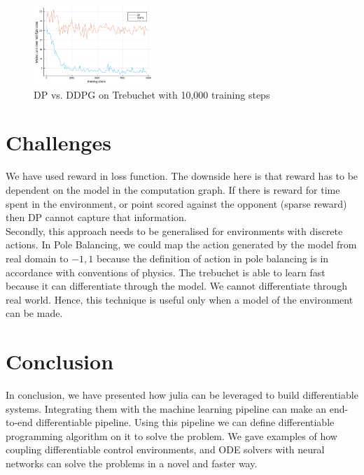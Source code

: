 \documentclass{juliacon}
\begin{document}
\begin{figure}[htbp]
    \centering
        \includegraphics[width=0.4\textwidth,keepaspectratio]{images/trebuchet_DPvsDDPG_10000.png}
            \caption{DP vs. DDPG\cite{Lillicrap2015ContinuousCW} on Trebuchet with 10,000 training steps}
            \label{fig:trebuchet_graph}
\end{figure}

\section{Challenges}
We have used reward in loss function. The downside here is that reward has to be dependent on the model in the computation graph. If there is reward for time spent in the environment, or point scored against the opponent (sparse reward) then DP cannot capture that information. \\
Secondly, this approach needs to be generalised for environments with discrete actions. In Pole Balancing, we could map the action generated by the model from real domain to ${-1, 1}$ because the definition of action in pole balancing is in accordance with conventions of physics.
The trebuchet is able to learn fast because it can differentiate through the model. We cannot differentiate through real world. Hence, this technique is useful only when a model of the environment can be made.

\section{Conclusion}
In conclusion, we have presented how julia can be leveraged to build differentiable systems. Integrating them with the machine learning pipeline can make an end-to-end differentiable pipeline. Using this pipeline we can define differentiable programming algorithm on it to solve the problem. We gave examples of how coupling differentiable control environments, and ODE solvers with neural networks can solve the problems in a novel and faster way.



\end{document}
